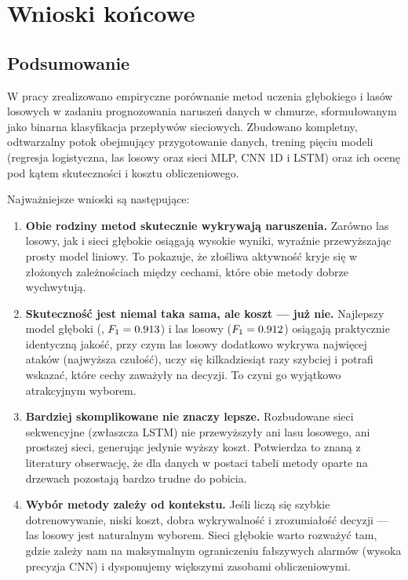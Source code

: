 \section{Wnioski końcowe}
\label{sec:wnioski}

\subsection{Podsumowanie}

W pracy zrealizowano empiryczne porównanie metod uczenia głębokiego i lasów
losowych w zadaniu prognozowania naruszeń danych w chmurze, sformułowanym jako
binarna klasyfikacja przepływów sieciowych. Zbudowano kompletny, odtwarzalny
potok obejmujący przygotowanie danych, trening pięciu modeli (regresja
logistyczna, las losowy oraz sieci MLP, CNN 1D i LSTM) oraz ich ocenę pod kątem
skuteczności i kosztu obliczeniowego.

Najważniejsze wnioski są następujące:
\begin{enumerate}
  \item \textbf{Obie rodziny metod skutecznie wykrywają naruszenia.} Zarówno las
        losowy, jak i sieci głębokie osiągają wysokie wyniki, wyraźnie
        przewyższając prosty model liniowy. To pokazuje, że złośliwa aktywność
        kryje się w złożonych zależnościach między cechami, które obie metody
        dobrze wychwytują.
  \item \textbf{Skuteczność jest niemal taka sama, ale koszt --- już nie.}
        Najlepszy model głęboki (\resBestDeepModel, $F_1 = 0.913$) i
        las losowy ($F_1 = 0.912$) osiągają praktycznie identyczną jakość,
        przy czym las losowy dodatkowo wykrywa najwięcej ataków (najwyższa
        czułość), uczy się kilkadziesiąt razy szybciej i potrafi wskazać, które
        cechy zaważyły na decyzji. To czyni go wyjątkowo atrakcyjnym wyborem.
  \item \textbf{Bardziej skomplikowane nie znaczy lepsze.} Rozbudowane sieci
        sekwencyjne (zwłaszcza LSTM) nie przewyższyły ani lasu losowego, ani
        prostszej sieci, generując jedynie wyższy koszt. Potwierdza to znaną z
        literatury obserwację, że dla danych w postaci tabeli metody oparte na
        drzewach pozostają bardzo trudne do pobicia.
  \item \textbf{Wybór metody zależy od kontekstu.} Jeśli liczą się szybkie
        dotrenowywanie, niski koszt, dobra wykrywalność i zrozumiałość decyzji
        --- las losowy jest naturalnym wyborem. Sieci głębokie warto rozważyć
        tam, gdzie zależy nam na maksymalnym ograniczeniu fałszywych alarmów
        (wysoka precyzja CNN) i dysponujemy większymi zasobami obliczeniowymi.
\end{enumerate}

